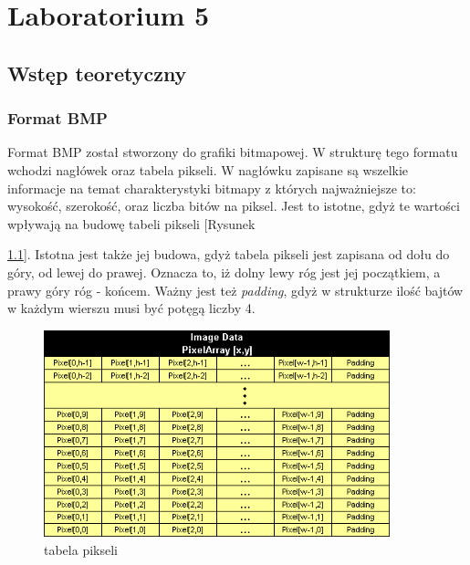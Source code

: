 \chapter{Laboratorium 5}
\section{Wstęp teoretyczny}
\subsection{Format BMP}
Format BMP został stworzony do grafiki bitmapowej\cite{bmp}. W strukturę tego formatu wchodzi nagłówek oraz tabela pikseli. W nagłówku zapisane są wszelkie informacje na temat charakterystyki bitmapy z których najważniejsze to: wysokość, szerokość, oraz liczba bitów na piksel. Jest to istotne, gdyż te wartości wpływają na budowę tabeli pikseli [Rysunek {\ref{fig:BMP}]. Istotna jest także jej budowa, gdyż tabela pikseli jest zapisana od dołu do góry, od lewej do prawej. Oznacza to, iż dolny lewy róg jest jej początkiem, a prawy góry róg - końcem. Ważny jest też \textit{padding}, gdyż w strukturze ilość bajtów w każdym wierszu musi być potęgą liczby 4.

\begin{figure}[H]
\centering
\includegraphics[height=6cm]{images/bmp.png}
\caption{tabela pikseli}
\label{fig:BMP}
\end{figure}

}
